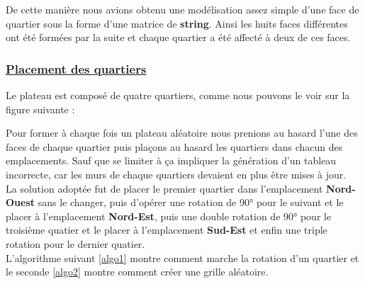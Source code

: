 \documentclass[12pt]{article}
\begin{document}
	De cette manière nous avions obtenu une modélisation assez simple d'une face de quartier sous la forme d'une matrice de \textbf{string}.	
	Ainsi les huits faces différentes ont été formées  par la suite et chaque quartier a été affecté à deux de ces faces.	

	\subsubsection{\underline{Placement des quartiers}}
	Le plateau est composé de quatre quartiers, comme nous pouvons le voir sur la figure suivante :
	\begin{center}
	\end{center}

	Pour former à chaque fois un plateau aléatoire nous prenions au hasard l'une des faces de chaque quartier puis plaçons au hasard 
	les quartiers dans chacun des emplacements. Sauf que se limiter à ça impliquer la génération d'un tableau incorrecte, car les 
	murs de chaque quartiers devaient en plus être mises à jour.\\
	La solution adoptée fut de placer le premier quartier dans l'emplacement \textbf{Nord-Ouest} sans le changer, puis d'opérer une rotation de 90° pour
	le suivant et le placer à l'emplacement \textbf{Nord-Est}, puis une double rotation de 90° pour le troisième quatier et le placer à l'emplacement \textbf{Sud-Est}
	et enfin une triple rotation pour le dernier quatier.\\
	L'algorithme suivant \ref{algo1} montre comment marche la rotation d'un quartier et le seconde \ref{algo2} montre comment créer une grille 
	aléatoire.
\end{document}
